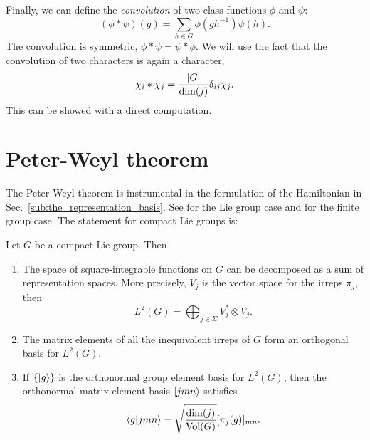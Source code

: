 Finally, we can define the \emph{convolution} of two class functions $\phi$ and $\psi$:
\begin{equation}
    (\phi \ast \psi)(g) = \sum_{h \in G} \phi(g h^{-1}) \psi(h).
\end{equation}
The convolution is symmetric, $\phi \ast \psi = \psi \ast \phi$.
We will use the fact that the convolution of two characters is again a character,
\begin{equation}
    \chi_i \ast \chi_j = \frac{\abs{G}}{\dim(j)}  \delta_{ij} \chi_j.
\end{equation}
This can be showed with a direct computation.


\section{Peter-Weyl theorem}
\label{sec:peter_weyl_theorem}

The Peter-Weyl theorem is instrumental in the formulation of the Hamiltonian in Sec.~\ref{sub:the_representation_basis}.
See \cite{knapp1996lie, tao2011peterweyl} for the Lie group case and \cite{serre1967representations} for the finite group case.
The statement for compact Lie groups is:

\begin{theorem}
    Let $G$ be a compact Lie group.
    Then
    \begin{enumerate}[label=(\roman*)]
        \item  The space of square-integrable functions on $G$ can be decomposed as a sum of representation spaces.
            More precisely, $V_{j}$ is the vector space for the irreps $\pi_j$, then
            \begin{equation}
                L^2(G) = \bigoplus_{j \in \Sigma} V_j^{\ast} \otimes V_j.
            \end{equation}

        \item The matrix elements of all the inequivalent irreps of $G$ form an orthogonal basis for $L^2(G)$.

        \item If $\{\ket{g}\}$ is the orthonormal group element basis for $L^2(G) $, then the orthonormal matrix element basis $\ket{jmn}$ satisfies
            \begin{equation}
                \braket{g}{jmn} =
                \sqrt{\frac{\dim(j)}{\mathrm{Vol}(G)}} [\pi_j(g)]_{mn}.
            \end{equation}
    \end{enumerate}
\end{theorem}

